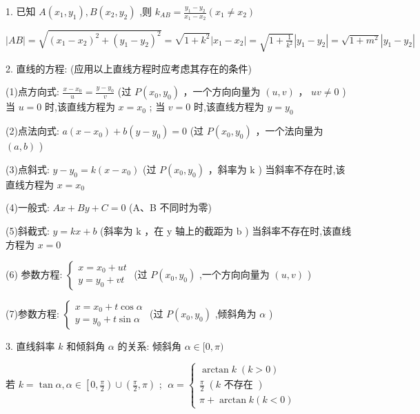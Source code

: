 \documentclass[10pt]{article}
\begin{document}
1. 已知 \(A\left( {{x}_{1},{y}_{1}}\right) ,B\left( {{x}_{2},{y}_{2}}\right)\) ,则 \({k}_{AB} = \frac{{y}_{1} - {y}_{2}}{{x}_{1} - {x}_{2}}\left( {{x}_{1} \neq  {x}_{2}}\right)\)

\(\left| {AB}\right|  = \sqrt{{\left( {x}_{1} - {x}_{2}\right) }^{2} + {\left( {y}_{1} - {y}_{2}\right) }^{2}} = \sqrt{1 + {k}^{2}}\left| {{x}_{1} - {x}_{2}}\right|  = \sqrt{1 + \frac{1}{{k}^{2}}}\left| {{y}_{1} - {y}_{2}}\right|  = \sqrt{1 + {m}^{2}}\left| {{y}_{1} - {y}_{2}}\right|\)

2. 直线的方程: (应用以上直线方程时应考虑其存在的条件)

(1)点方向式: \(\frac{x - {x}_{0}}{u} = \frac{y - {y}_{0}}{v}\) (过 \(P\left( {{x}_{0},{y}_{0}}\right)\) ，一个方向向量为 \(\left( {u,v}\right)\) ， \({uv} \neq  0\) ) 当 \(u = 0\) 时,该直线方程为 \(x = {x}_{0}\) ; 当 \(v = 0\) 时,该直线方程为 \(y = {y}_{0}\)

(2)点法向式: \(a\left( {x - {x}_{0}}\right)  + b\left( {y - {y}_{0}}\right)  = 0\) (过 \(P\left( {{x}_{0},{y}_{0}}\right)\) ，一个法向量为 \(\left( {a,b}\right)\) )

(3)点斜式: \(y - {y}_{0} = k\left( {x - {x}_{0}}\right)\) (过 \(P\left( {{x}_{0},{y}_{0}}\right)\) ，斜率为 \(\mathrm{k}\) ) 当斜率不存在时,该直线方程为 \(x = {x}_{0}\)

(4)一般式: \({Ax} + {By} + C = 0\) (A、B 不同时为零)

(5)斜截式: \(y = {kx} + b\) (斜率为 \(\mathrm{k}\) ，在 \(\mathrm{y}\) 轴上的截距为 \(\mathrm{b}\) ) 当斜率不存在时,该直线方程为 \(x = 0\)

(6) 参数方程: \(\left\{  \begin{array}{l} x = {x}_{0} + {ut} \\  y = {y}_{0} + {vt} \end{array}\right.\) (过 \(P\left( {{x}_{0},{y}_{0}}\right)\) ,一个方向向量为 \(\left( {u,v}\right)\) )

(7)参数方程: \(\left\{  \begin{array}{l} x = {x}_{0} + t\cos \alpha \\  y = {y}_{0} + t\sin \alpha  \end{array}\right.\) (过 \(P\left( {{x}_{0},{y}_{0}}\right)\) ,倾斜角为 \(\alpha\) )

3. 直线斜率 \(k\) 和倾斜角 \(\alpha\) 的关系: 倾斜角 \(\alpha  \in  \lbrack 0,\pi )\)

若 \(k = \tan \alpha ,\alpha  \in  \left\lbrack  {0,\frac{\pi }{2}}\right)  \cup  \left( {\frac{\pi }{2},\pi }\right)\) ; \(\;\alpha  = \left\{  \begin{array}{l} \arctan k\;\left( {k > 0}\right) \\  \frac{\pi }{2}\;\left( {k\text{ 不存在 }}\right) \\  \pi  + \arctan k\left( {k < 0}\right)  \end{array}\right.\)
\end{document}
